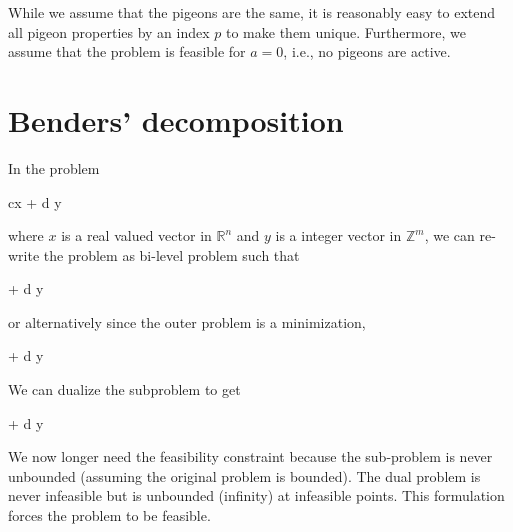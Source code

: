 \documentclass{article}
\DeclareMathOperator*{\argmin}{arg\,min}
\begin{document}
    While we assume that the pigeons are the same, it is reasonably easy to extend all pigeon properties by an index $p$ to make them unique. Furthermore, we assume that the problem is feasible for $a=0$, i.e., no pigeons are active.
    \section{Benders' decomposition}

    In the problem
    \begin{mini!}
        {}{c\cdot x + d \cdot y}{}{}
    \end{mini!}
    where $x$ is a real valued vector in $\mathbb{R}^n$ and $y$ is a integer vector in $\mathbb{Z}^m$, we can re-write the problem as bi-level problem such that
    \begin{mini!}
        {}{\theta + d \cdot y}{}{}
        \addConstraint{\theta \in \argmin_x\{c\cdot x | Ax = b - By, x\geq 0\}.\label{benders:2:sp}}
    \end{mini!}
    or alternatively since the outer problem is a minimization,
    \begin{mini!}
        {}{\theta{} + d \cdot y}{}{}
    \end{mini!}
    We can dualize the subproblem to get
    \begin{mini!}
        {}{\theta + d \cdot y}{}{}
    \end{mini!}
    We now longer need the feasibility constraint because the sub-problem is never unbounded (assuming the original problem is bounded). The dual problem is never infeasible but is unbounded (infinity) at infeasible points. This formulation forces the problem to be feasible.

    
	
\end{document}
